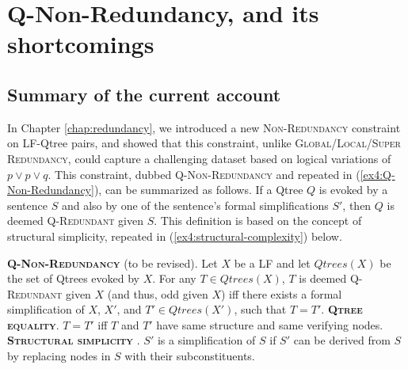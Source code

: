 %

 


\section[Q-Non-Redundancy]{Q-Non-Redundancy, and its shortcomings}\label{sec5:q-non-redundancy}

\subsection{Summary of the current account}

In Chapter \ref{chap:redundancy}, we introduced a new \textsc{Non-Redundancy} constraint on LF-Qtree pairs, and showed that this constraint, unlike \textsc{Global/Local/Super Redundancy}, could capture a challenging dataset based on logical variations of $p \vee p \vee q$. This constraint, dubbed \textsc{Q-Non-Redundancy} and repeated in (\ref{ex4:Q-Non-Redundancy}), can be summarized as follows. If a Qtree $Q$ is evoked by a sentence $S$ and also by one of the sentence's formal simplifications $S'$, then $Q$ is deemed \textsc{Q-Redundant} given $S$. This definition is based on the concept of structural simplicity, repeated in (\ref{ex4:structural-complexity}) below.

\begin{exe}
	 {\textsc{\textbf{Q-Non-Redundancy}} (to be revised). Let $X$ be a LF and let $Qtrees(X)$ be the set of Qtrees evoked by $X$. For any $T \in Qtrees(X)$, $T$ is deemed \textsc{Q-Redundant} given $X$ (and thus, odd given $X$) iff there exists a formal simplification of $X$, $X'$, and $T' \in Qtrees(X')$, such that $T=T'$.}
	 {\textsc{\textbf{Qtree equality}}. $T = T'$ iff $T$ and $T'$ have same structure and same verifying nodes.}
	 {\textsc{\textbf{Structural simplicity}} \parencite{Katzir2007}. $S'$ is a simplification of $S$ if $S'$ can be derived from $S$ by replacing nodes in $S$ with their subconstituents.}
\end{exe}

